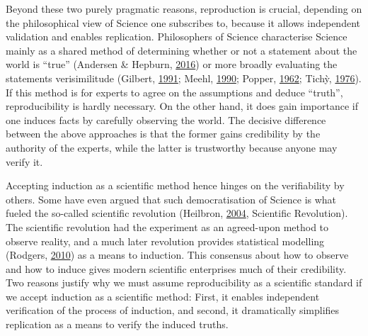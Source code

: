 \documentclass[12pt,a4paper,twoside]{article}
\begin{document}
Beyond these two purely pragmatic reasons, reproduction is crucial, depending on the philosophical view of Science one subscribes to, because it allows independent validation and enables replication.
Philosophers of Science characterise Science mainly as a shared method of determining whether or not a statement about the world is ``true'' (Andersen \& Hepburn, \protect\hyperlink{ref-andersonScientificMethod2016}{2016}) or more broadly evaluating the statements verisimilitude (Gilbert, \protect\hyperlink{ref-gilbertModelBuildingDefinition1991}{1991}; Meehl, \protect\hyperlink{ref-meehlAppraisingAmendingTheories1990}{1990}; Popper, \protect\hyperlink{ref-popperCommentsTruthGrowth1962}{1962}; Tichỳ, \protect\hyperlink{ref-tichyVerisimilitudeRedefined1976}{1976}).
If this method is for experts to agree on the assumptions and deduce ``truth'', reproducibility is hardly necessary.
On the other hand, it does gain importance if one induces facts by carefully observing the world.
The decisive difference between the above approaches is that the former gains credibility by the authority of the experts, while the latter is trustworthy because anyone may verify it.

Accepting induction as a scientific method hence hinges on the verifiability by others.
Some have even argued that such democratisation of Science is what fueled the so-called scientific revolution (Heilbron, \protect\hyperlink{ref-heilbronOxfordCompanionHistory2004}{2004}, Scientific Revolution).
The scientific revolution had the experiment as an agreed-upon method to observe reality, and a much later revolution provides statistical modelling (Rodgers, \protect\hyperlink{ref-rodgersEpistemologyMathematicalStatistical2010}{2010}) as a means to induction.
This consensus about how to observe and how to induce gives modern scientific enterprises much of their credibility.
Two reasons justify why we must assume reproducibility as a scientific standard if we accept induction as a scientific method:
First, it enables independent verification of the process of induction, and second, it dramatically simplifies replication as a means to verify the induced truths.
\end{document}
